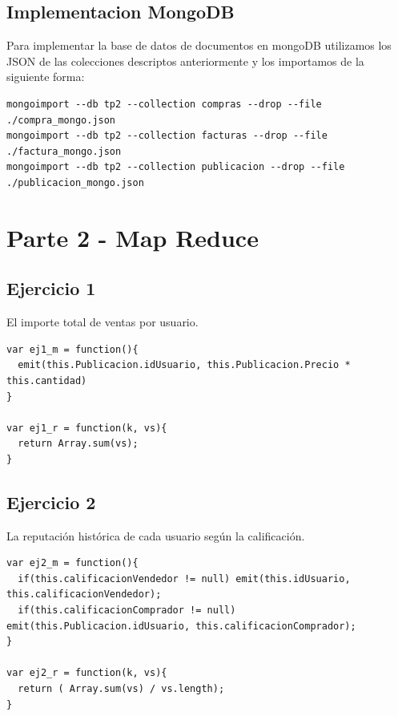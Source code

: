 \documentclass[a4paper, 10pt, twoside]{article}
\begin{document}
\subsection{Implementacion MongoDB}
Para implementar la base de datos de documentos en mongoDB utilizamos los JSON de las colecciones descriptos anteriormente y los importamos de la siguiente forma:

\begin{verbatim}
mongoimport --db tp2 --collection compras --drop --file ./compra_mongo.json 
mongoimport --db tp2 --collection facturas --drop --file ./factura_mongo.json
mongoimport --db tp2 --collection publicacion --drop --file ./publicacion_mongo.json
\end{verbatim}
\section{Parte 2 - Map Reduce}
\subsection{Ejercicio 1}
El importe total de ventas por usuario.


\begin{lstlisting}
var ej1_m = function(){ 
  emit(this.Publicacion.idUsuario, this.Publicacion.Precio * this.cantidad) 
}

var ej1_r = function(k, vs){
  return Array.sum(vs);
}

\end{lstlisting}


\subsection{Ejercicio 2}
La reputaci\'on hist\'orica de cada usuario seg\'un la calificaci\'on.

\begin{lstlisting}
var ej2_m = function(){
  if(this.calificacionVendedor != null) emit(this.idUsuario, this.calificacionVendedor);
  if(this.calificacionComprador != null) emit(this.Publicacion.idUsuario, this.calificacionComprador);
}

var ej2_r = function(k, vs){
  return ( Array.sum(vs) / vs.length);
}
\end{lstlisting}
\end{document}
